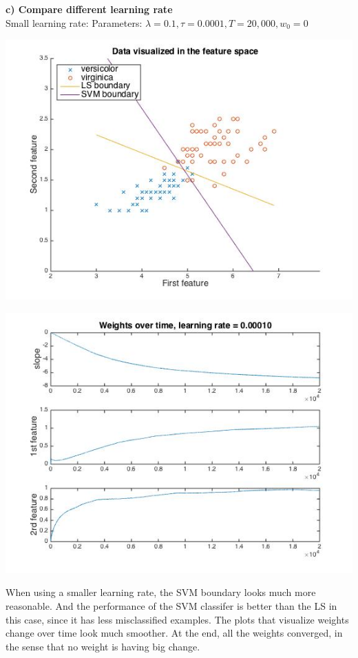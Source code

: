 \documentclass[paper=a4, fontsize=11pt]{scrartcl} %
\numberwithin{equation}{section} %
\numberwithin{figure}{section} %
\numberwithin{table}{section} %
\begin{document}
\newpage
\textbf{c) Compare different learning rate}\\
Small learning rate: Parameters:
$\lambda = 0.1, \tau = 0.0001, T = 20,000, w_0 = 0$
\begin{center}
\includegraphics[scale=.6]{hw7_4c_smlr_532.jpg}
\end{center}
\begin{center}
\includegraphics[scale=.5]{hw7_4c_smlr_weights_532.jpg}
\end{center}

When using a smaller learning rate, the SVM boundary looks much more reasonable. And the performance of the SVM classifer is better than the LS in this case, since it has less misclassified examples. The plots that visualize weights change over time look much smoother. At the end, all the weights converged, in the sense that no weight is having big change. 
\end{document}

